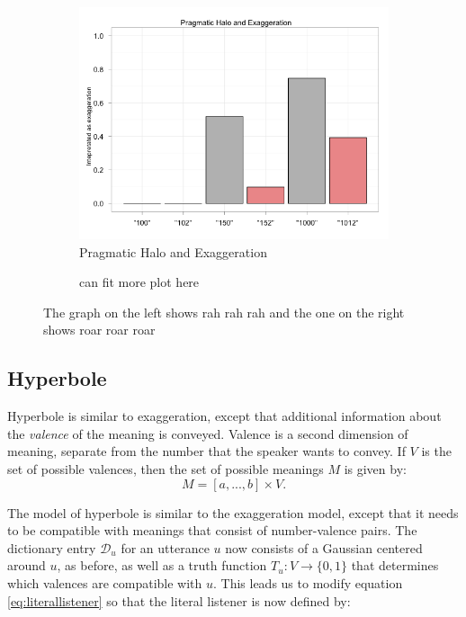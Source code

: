 \documentclass{article} %
\newcommand{\dictionary}{\ensuremath{\mathcal{D}}\xspace}
\begin{document}
\begin{figure}
        \begin{subfigure}[b]{0.5\textwidth}
                \centering
                \includegraphics[width=\textwidth]{model_halo_exaggeration.png}
		\caption{Pragmatic Halo and Exaggeration}
	\end{subfigure}
	 \begin{subfigure}[b]{0.33\textwidth}
                \centering
		\caption{can fit more plot here}
	\end{subfigure}
	\caption{The graph on the left shows rah rah rah and the one on the right shows roar roar roar}
\end{figure}

\subsection{Hyperbole}

Hyperbole is similar to exaggeration, except that additional information about the \emph{valence} of the meaning is conveyed. Valence is a second dimension of meaning, separate from the number that the speaker wants to convey. If $V$ is the set of possible valences, then the set of possible meanings $M$ is given by:
\begin{equation}
M = [a,...,b] \times V.
\end{equation}

The model of hyperbole is similar to the exaggeration model, except that it needs to be compatible with meanings that consist of number-valence pairs. The dictionary entry $\dictionary_u$ for an utterance $u$ now consists of a Gaussian centered around $u$, as before, as well as a truth function $T_u:V\rightarrow \{0,1\}$ that determines which valences are compatible with $u$. This leads us to modify equation \ref{eq:literallistener} so that the literal listener is now defined by:
\end{document}
